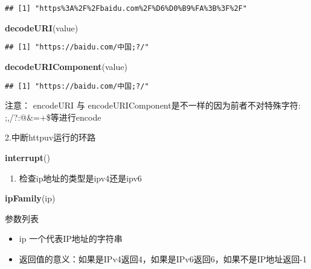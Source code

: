 \documentclass[]{book}
\newenvironment{Shaded}{\begin{snugshade}}{\end{snugshade}}
\newcommand{\KeywordTok}[1]{\textcolor[rgb]{0.13,0.29,0.53}{\textbf{#1}}}
\newcommand{\NormalTok}[1]{#1}
\providecommand{\tightlist}{%
  \setlength{\itemsep}{0pt}\setlength{\parskip}{0pt}}
\theoremstyle{definition}
\theoremstyle{definition}
\theoremstyle{definition}
\theoremstyle{remark}
\begin{document}
\begin{verbatim}
## [1] "https%3A%2F%2Fbaidu.com%2F%D6%D0%B9%FA%3B%3F%2F"
\end{verbatim}

\begin{Shaded}
\begin{Highlighting}[]
\KeywordTok{decodeURI}\NormalTok{(value)}
\end{Highlighting}
\end{Shaded}

\begin{verbatim}
## [1] "https://baidu.com/中国;?/"
\end{verbatim}

\begin{Shaded}
\begin{Highlighting}[]
\KeywordTok{decodeURIComponent}\NormalTok{(value)}
\end{Highlighting}
\end{Shaded}

\begin{verbatim}
## [1] "https://baidu.com/中国;?/"
\end{verbatim}

注意： encodeURI 与 encodeURIComponent是不一样的因为前者不对特殊字符:
;,/?:@\&=+\$等进行encode

2.中断httpuv运行的环路

\begin{Shaded}
\begin{Highlighting}[]
\KeywordTok{interrupt}\NormalTok{()}
\end{Highlighting}
\end{Shaded}

\begin{enumerate}
\def\labelenumi{\arabic{enumi}.}
\setcounter{enumi}{2}
\tightlist
\item
  检查ip地址的类型是ipv4还是ipv6
\end{enumerate}

\begin{Shaded}
\begin{Highlighting}[]
\KeywordTok{ipFamily}\NormalTok{(ip)}
\end{Highlighting}
\end{Shaded}

参数列表

\begin{itemize}
\item
  ip 一个代表IP地址的字符串
\item
  返回值的意义：如果是IPv4返回4，如果是IPv6返回6，如果不是IP地址返回-1
\end{itemize}
\end{document}
